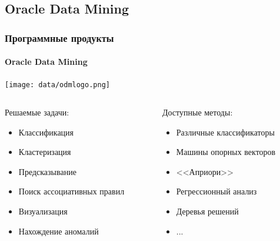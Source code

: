 \documentclass[xcolor=table]{beamer}
\begin{document}
\subsection{Oracle Data Mining}
\begin{frame}
  \frametitle{Программные продукты}
  \framesubtitle{Oracle Data Mining}
  \vspace{-25pt}
  \begin{center}
    {\texttt{[image: data/odmlogo.png]}}
  \end{center}

  
  \begin{columns}[t]
     \begin{column}{0.5\textwidth}
       Решаемые задачи:
       \vspace{-5pt}
       \begin{center}
         \begin{itemize}
           \item Классификация
           \item Кластеризация
           \item Предсказывание
           \item Поиск ассоциативных правил
           \item Визуализация
           \item Нахождение аномалий
         \end{itemize}
       \end{center}
     \end{column}
    
     \begin{column}{0.5\textwidth}
       Доступные методы:
       \vspace{-5pt}
       \begin{center}
         \begin{itemize}
           \item Различные классификаторы
           \item Машины опорных векторов
           \item {<<Априори>>}
           \item Регрессионный анализ
           \item Деревья решений
           \item ...
         \end{itemize}
       \end{center}
     \end{column}
   \end{columns}
\end{frame}
\end{document}
